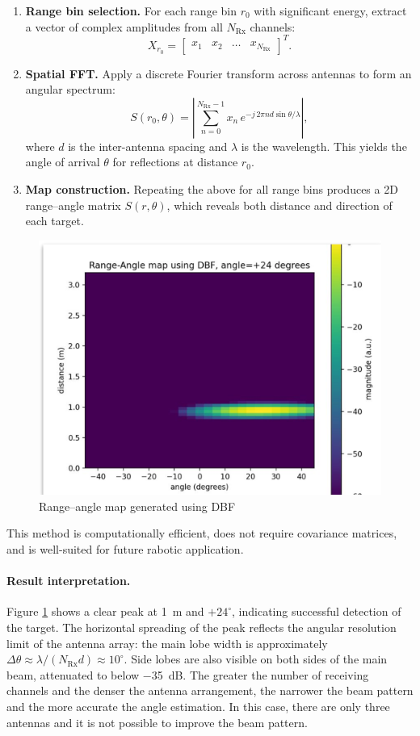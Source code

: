 \begin{enumerate}
    \item \textbf{Range bin selection.} For each range bin $r_0$ with significant energy, extract a vector of complex amplitudes from all $N_\text{Rx}$ channels:
    $$
        X_{r_0} = \begin{bmatrix} x_1 & x_2 & \dots & x_{N_\text{Rx}} \end{bmatrix}^T.
    $$

    \item \textbf{Spatial FFT.} Apply a discrete Fourier transform across antennas to form an angular spectrum:
    $$
        S(r_0,\theta) = \left| \sum_{n=0}^{N_\text{Rx}-1} x_n\,e^{-j\,2\pi n d \sin\theta / \lambda} \right|,
    $$
    where $d$ is the inter-antenna spacing and $\lambda$ is the wavelength. This yields the angle of arrival $\theta$ for reflections at distance $r_0$.

    \item \textbf{Map construction.} Repeating the above for all range bins produces a 2D range–angle matrix $S(r,\theta)$, which reveals both distance and direction of each target.
\end{enumerate}



\begin{figure}[H]
    \centering
    \includegraphics[width=0.6\linewidth]{Src/images/beam.png}
    \caption{Range–angle map generated using DBF}
    \label{fig:beam_example}
\end{figure}
This method is computationally efficient, does not require covariance matrices, and is well-suited for future rabotic application.

\paragraph{Result interpretation.}  
Figure \ref{fig:beam_example} shows a clear peak at \SI{1}{m} and $+24^{\circ}$, indicating successful detection of the target.  
The horizontal spreading of the peak reflects the angular resolution limit of the antenna array: the main lobe width is approximately $\Delta\theta\!\approx\!\lambda / (N_\text{Rx} d) \approx 10^{\circ}$.  
Side lobes are also visible on both sides of the main beam, attenuated to below \SI{-35}{dB}.  
The greater the number of receiving channels and the denser the antenna arrangement, the narrower the beam pattern and the more accurate the angle estimation. In this case, there are only three antennas and it is not possible to improve the beam pattern.



